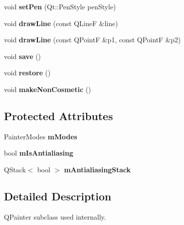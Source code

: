 \begin{DoxyCompactItemize}
\mbox{\label{class_q_c_p_painter_a25e76095aae41da0d08035060e5f81ca}} 
void {\bfseries set\+Pen} (Qt\+::\+Pen\+Style pen\+Style)
\item 
\mbox{\label{class_q_c_p_painter_a0b4b1b9bd495e182c731774dc800e6e0}} 
void {\bfseries draw\+Line} (const Q\+LineF \&line)
\item 
\mbox{\label{class_q_c_p_painter_ad1638db27929491b3f1beb74d6cbad5e}} 
void {\bfseries draw\+Line} (const Q\+PointF \&p1, const Q\+PointF \&p2)
\item 
\mbox{\label{class_q_c_p_painter_a8fd6821ee6fecbfa04444c9062912abd}} 
void {\bfseries save} ()
\item 
\mbox{\label{class_q_c_p_painter_a64908e6298d5bbd83457dc987cc3a022}} 
void {\bfseries restore} ()
\item 
\mbox{\label{class_q_c_p_painter_a7e63fbcf47e35c6f2ecd11b8fef7c7d8}} 
void {\bfseries make\+Non\+Cosmetic} ()
\end{DoxyCompactItemize}
\subsection*{Protected Attributes}
\begin{DoxyCompactItemize}
\item 
\mbox{\label{class_q_c_p_painter_af5d1d6e5df0adbc7de5633250fb3396c}} 
Painter\+Modes {\bfseries m\+Modes}
\item 
\mbox{\label{class_q_c_p_painter_a7055085da176aee0f6b23298f1003d08}} 
bool {\bfseries m\+Is\+Antialiasing}
\item 
\mbox{\label{class_q_c_p_painter_a1e7db2d502086480a77540196cb8b085}} 
Q\+Stack$<$ bool $>$ {\bfseries m\+Antialiasing\+Stack}
\end{DoxyCompactItemize}


\subsection{Detailed Description}
Q\+Painter subclass used internally. 

